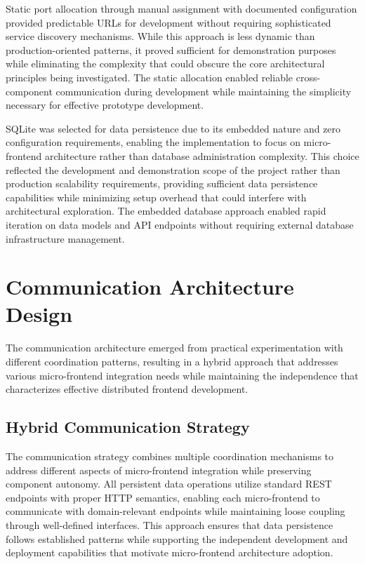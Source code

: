 \documentclass[12pt,a4paper]{report}
\begin{document}
Static port allocation through manual assignment with documented configuration provided predictable URLs for development without requiring sophisticated service discovery mechanisms. While this approach is less dynamic than production-oriented patterns, it proved sufficient for demonstration purposes while eliminating the complexity that could obscure the core architectural principles being investigated. The static allocation enabled reliable cross-component communication during development while maintaining the simplicity necessary for effective prototype development.

SQLite was selected for data persistence due to its embedded nature and zero configuration requirements, enabling the implementation to focus on micro-frontend architecture rather than database administration complexity. This choice reflected the development and demonstration scope of the project rather than production scalability requirements, providing sufficient data persistence capabilities while minimizing setup overhead that could interfere with architectural exploration. The embedded database approach enabled rapid iteration on data models and API endpoints without requiring external database infrastructure management.

\section{Communication Architecture Design}

The communication architecture emerged from practical experimentation with different coordination patterns, resulting in a hybrid approach that addresses various micro-frontend integration needs while maintaining the independence that characterizes effective distributed frontend development.

\subsection{Hybrid Communication Strategy}

The communication strategy combines multiple coordination mechanisms to address different aspects of micro-frontend integration while preserving component autonomy. All persistent data operations utilize standard REST endpoints with proper HTTP semantics, enabling each micro-frontend to communicate with domain-relevant endpoints while maintaining loose coupling through well-defined interfaces. This approach ensures that data persistence follows established patterns while supporting the independent development and deployment capabilities that motivate micro-frontend architecture adoption.
\end{document}
